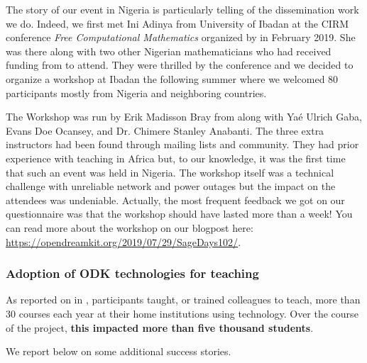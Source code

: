 \begin{enumerate}
  The story of our event in Nigeria is particularly telling of the 
  dissemination work we do. Indeed, we first met Ini Adinya from University of Ibadan at the
  CIRM conference \emph{Free Computational Mathematics} organized by \ODK in February 2019. She 
  was there along with two other Nigerian mathematicians who had received funding from \ODK to attend. 
  They were thrilled by the conference and we decided to organize a \Sage workshop at Ibadan the 
  following summer where we welcomed 80 participants mostly from Nigeria and neighboring countries.
  
  The Workshop was run by Erik Madisson Bray from \ODK along with Yaé Ulrich Gaba, Evans Doe Ocansey, and Dr. Chimere 
  Stanley Anabanti. The three extra instructors had been found through \Sage mailing lists and community. They had prior
  experience with teaching \Sage in Africa but, to our knowledge, it was the first time that such an event was held in Nigeria.
  The workshop itself was a technical challenge with unreliable network and power outages but the impact on the attendees was
  undeniable. Actually, the most frequent feedback we got on our questionnaire was that the workshop should have lasted more than 
  a week! You can read more about the workshop on our blogpost here: \url{https://opendreamkit.org/2019/07/29/SageDays102/}.
\end{enumerate}

\subsubsection{Adoption of ODK technologies for teaching}

As reported on in , \ODK
participants taught, or trained colleagues to teach, more than 30
courses each year at their home institutions using \ODK
technology. Over the course of the project, \textbf{this impacted more
  than five thousand students}.

We report below on some additional success stories.

